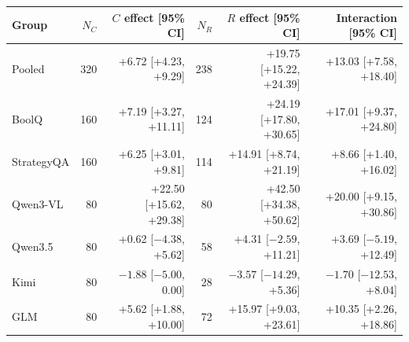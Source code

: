 \begin{tabular}{lrrrrr}
\toprule
Group & $N_C$ & $C$ effect [95\% CI] & $N_R$ & $R$ effect [95\% CI] & Interaction [95\% CI]\\
\midrule
Pooled & 320 & +6.72 [+4.23, +9.29] & 238 & +19.75 [+15.22, +24.39] & +13.03 [+7.58, +18.40]\\
BoolQ & 160 & +7.19 [+3.27, +11.11] & 124 & +24.19 [+17.80, +30.65] & +17.01 [+9.37, +24.80]\\
StrategyQA & 160 & +6.25 [+3.01, +9.81] & 114 & +14.91 [+8.74, +21.19] & +8.66 [+1.40, +16.02]\\
Qwen3-VL & 80 & +22.50 [+15.62, +29.38] & 80 & +42.50 [+34.38, +50.62] & +20.00 [+9.15, +30.86]\\
Qwen3.5 & 80 & +0.62 [$-4.38$, +5.62] & 58 & +4.31 [$-2.59$, +11.21] & +3.69 [$-5.19$, +12.49]\\
Kimi & 80 & $-1.88$ [$-5.00$, 0.00] & 28 & $-3.57$ [$-14.29$, +5.36] & $-1.70$ [$-12.53$, +8.04]\\
GLM & 80 & +5.62 [+1.88, +10.00] & 72 & +15.97 [+9.03, +23.61] & +10.35 [+2.26, +18.86]\\
\bottomrule
\end{tabular}
